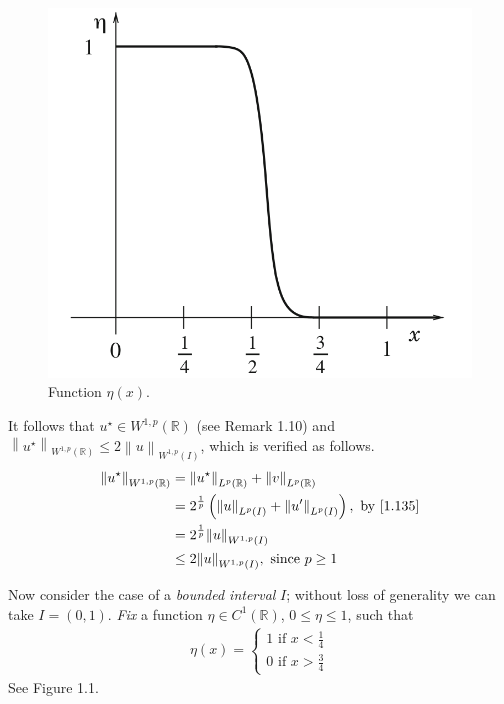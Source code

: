 \documentclass[a4paper,oneside]{book}
\numberwithin{equation}{chapter}
\begin{document}
\begin{figure}[H]
\centering
\includegraphics[scale=0.35]{1}
\caption{Function $\eta \left(x\right)$.}
\end{figure}
It follows that $u^{\star} \in W^{1,p}\left(\mathbb{R}\right)$ (see Remark 1.10) and ${\left\| {u^{\star}} \right\|_{{W^{1,p}}\left( \mathbb{R}  \right)}} \le 2{\left\| u \right\|_{{W^{1,p}}\left( I \right)}}$, which is verified as follows.
\begin{align}
{\left\| {u^{\star} } \right\|_{{W^{1,p}}\left( \mathbb{R} \right)}} &= {\left\| {u^{\star} } \right\|_{{L^p}\left( \mathbb{R} \right)}} + {\left\| v \right\|_{{L^p}\left( \mathbb{R} \right)}}\\
 &= {2^{\frac{1}{p}}}\left( {{{\left\| u \right\|}_{{L^p}\left( I \right)}} + {{\left\| {u'} \right\|}_{{L^p}\left( I \right)}}} \right),\mbox{ by \eqref{1.135}}\\
 & = {2^{\frac{1}{p}}}{\left\| u \right\|_{{W^{1,p}}\left( I \right)}}\\
 &\le 2{\left\| u \right\|_{{W^{1,p}}\left( I \right)}}, \mbox{ since } p \ge 1
\end{align}

Now consider the case of a \textit{bounded interval} $I$; without loss of generality we can take $I=\left(0,1\right)$. \textit{Fix} a function $\eta \in C^1\left(\mathbb{R}\right)$, $0\le \eta \le 1$, such that
\begin{align}
\label{1.150}
\eta \left( x \right) = \left\{ {\begin{array}{*{20}{c}}
{1\mbox{ if } x < \frac{1}{4}}\\
{0\mbox{ if } x > \frac{3}{4}}
\end{array}} \right.
\end{align}
See Figure 1.1.
\end{document}
